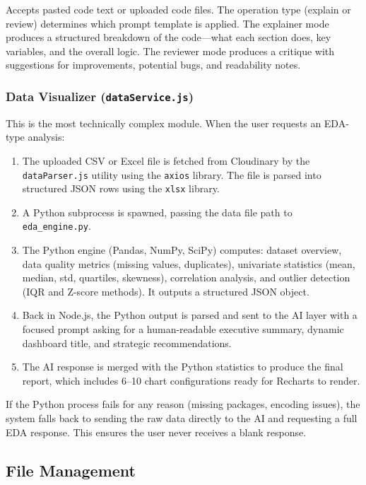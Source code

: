 \documentclass[12pt,a4paper]{article}
\begin{document}
Accepts pasted code text or uploaded code files. The operation type (explain or review) determines which prompt template is applied. The explainer mode produces a structured breakdown of the code—what each section does, key variables, and the overall logic. The reviewer mode produces a critique with suggestions for improvements, potential bugs, and readability notes.

\subsubsection{Data Visualizer (\texttt{dataService.js})}

This is the most technically complex module. When the user requests an EDA-type analysis:

\begin{enumerate}
    \item The uploaded CSV or Excel file is fetched from Cloudinary by the \texttt{dataParser.js} utility using the \texttt{axios} library. The file is parsed into structured JSON rows using the \texttt{xlsx} library.
    \item A Python subprocess is spawned, passing the data file path to \texttt{eda\_engine.py}.
    \item The Python engine (Pandas, NumPy, SciPy) computes: dataset overview, data quality metrics (missing values, duplicates), univariate statistics (mean, median, std, quartiles, skewness), correlation analysis, and outlier detection (IQR and Z-score methods). It outputs a structured JSON object.
    \item Back in Node.js, the Python output is parsed and sent to the AI layer with a focused prompt asking for a human-readable executive summary, dynamic dashboard title, and strategic recommendations.
    \item The AI response is merged with the Python statistics to produce the final report, which includes 6--10 chart configurations ready for Recharts to render.
\end{enumerate}

If the Python process fails for any reason (missing packages, encoding issues), the system falls back to sending the raw data directly to the AI and requesting a full EDA response. This ensures the user never receives a blank response.

\subsection{File Management}
\end{document}
